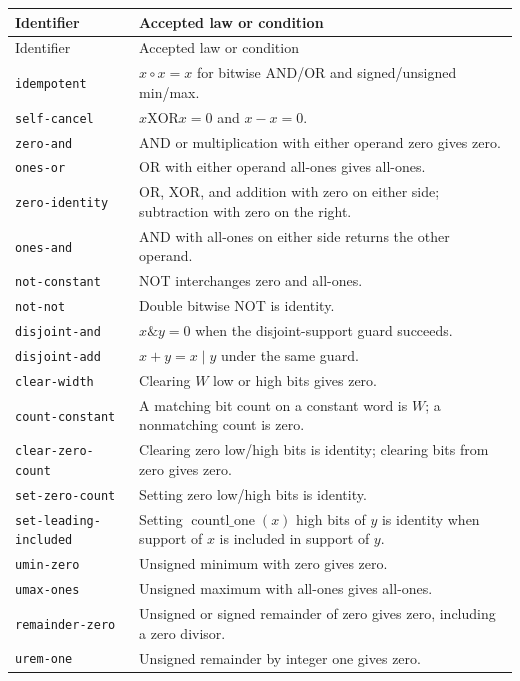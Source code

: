 \small
\begin{longtable}{@{}p{}p{}@{}}
\toprule
Identifier & Accepted law or condition\\\midrule
\endfirsthead
\toprule Identifier & Accepted law or condition\\\midrule
\endhead
\bottomrule\endfoot
\texttt{idempotent} & $x\circ x=x$ for bitwise AND/OR and signed/unsigned min/max.\\
\texttt{self-cancel} & $x\mathbin{\mathrm{XOR}}x=0$ and $x-x=0$.\\
\texttt{zero-and} & AND or multiplication with either operand zero gives zero.\\
\texttt{ones-or} & OR with either operand all-ones gives all-ones.\\
\texttt{zero-identity} & OR, XOR, and addition with zero on either side; subtraction with zero on the right.\\
\texttt{ones-and} & AND with all-ones on either side returns the other operand.\\
\texttt{not-constant} & NOT interchanges zero and all-ones.\\
\texttt{not-not} & Double bitwise NOT is identity.\\
\texttt{disjoint-and} & $x\mathbin{\&}y=0$ when the disjoint-support guard succeeds.\\
\texttt{disjoint-add} & $x+y=x\mathbin{|}y$ under the same guard.\\
\texttt{clear-width} & Clearing $W$ low or high bits gives zero.\\
\texttt{count-constant} & A matching bit count on a constant word is $W$; a nonmatching count is zero.\\
\texttt{clear-zero-count} & Clearing zero low/high bits is identity; clearing bits from zero gives zero.\\
\texttt{set-zero-count} & Setting zero low/high bits is identity.\\
\texttt{set-leading-included} & Setting $\operatorname{countl\_one}(x)$ high bits of $y$ is identity when support of $x$ is included in support of $y$.\\
\texttt{umin-zero} & Unsigned minimum with zero gives zero.\\
\texttt{umax-ones} & Unsigned maximum with all-ones gives all-ones.\\
\texttt{remainder-zero} & Unsigned or signed remainder of zero gives zero, including a zero divisor.\\
\texttt{urem-one} & Unsigned remainder by integer one gives zero.\\

\end{longtable}

